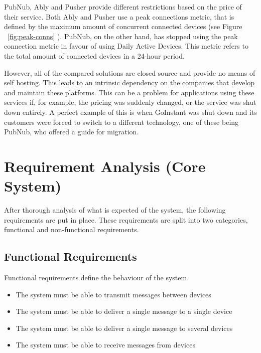 PubNub, Ably and Pusher provide different restrictions based on the price of their service. Both Ably and Pusher use a peak connections metric, that is defined by the maximum amount of concurrent connected devices (see Figure ~\ref{fig:peak-conns} ). PubNub, on the other hand, has stopped using the peak connection metric\cite{pubnub-peak} in favour of using Daily Active Devices. This metric refers to the total amount of connected devices in a 24-hour period.

However, all of the compared solutions are closed source and provide no means of self hosting. This leads to an intrinsic dependency on the companies that develop and maintain these platforms. This can be a problem for applications using these services if, for example, the pricing was suddenly changed, or the service was shut down entirely. A perfect example of this is when GoInstant was shut down and its customers were forced to switch to a different technology, one of these being PubNub, who offered a guide for migration\cite{pubnub-goinstant}.

\section{Requirement Analysis (Core System)}

After thorough analysis of what is expected of the system, the following requirements are put in place. These requirements are split into two categories, functional and non-functional requirements.

\subsection{Functional Requirements}
Functional requirements define the behaviour of the system.
\begin{itemize}
\item The system must be able to transmit messages between devices
\item The system must be able to deliver a single message to a single device
\item The system must be able to deliver a single message to several devices
\item The system must be able to receive messages from devices
\end{itemize}

